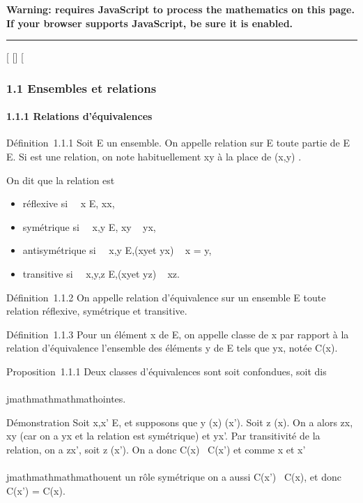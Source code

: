 \textbf{Warning: 
requires JavaScript to process the mathematics on this page.\\ If your
browser supports JavaScript, be sure it is enabled.}

\begin{center}\rule{3in}{0.4pt}\end{center}

{[}
{[}{]}
{[}

\subsubsection{1.1 Ensembles et relations}

\paragraph{1.1.1 Relations d'équivalences}

Définition~1.1.1 Soit E un ensemble. On appelle relation sur E toute
partie de E \times E. Si  est une relation, on note habituellement xy à la
place de (x,y) \in{}.

On dit que la relation est

\begin{itemize}
\itemsep1pt\parskip0pt
\item
  réflexive si \forall~~x \in E, xx,
\item
  symétrique si \forall~~x,y \in E,\quad
  xy \rigtharrow~ yx,
\item
  antisymétrique si \forall~~x,y \in
  E,\quad (xy\text et yx) \rigtharrow~ x = y,
\item
  transitive si \forall~~x,y,z \in
  E,\quad (xy\text et yz) \rigtharrow~ xz.
\end{itemize}

Définition~1.1.2 On appelle relation d'équivalence sur un ensemble E
toute relation réflexive, symétrique et transitive.

Définition~1.1.3 Pour un élément x de E, on appelle classe de x par
rapport à la relation d'équivalence  l'ensemble des éléments y de E
tels que yx, notée C(x).

Proposition~1.1.1 Deux classes d'équivalences sont soit confondues, soit
dis\\\\jmathmathmathmathointes.

Démonstration Soit x,x' \in E, et supposons que y \inC(x) \bigcapC(x'). Soit z
\inC(x). On a alors zx, xy (car on a yx et la relation est symétrique)
et yx'. Par transitivité de la relation, on a zx', soit z \inC(x'). On a
donc C(x) \subset~C(x') et comme x et x' \\\\jmathmathmathmathouent un rôle symétrique on a aussi
C(x') \subset~C(x), et donc C(x') = C(x).

